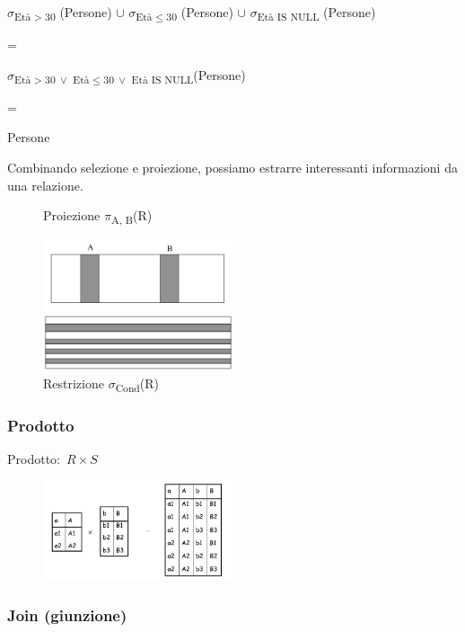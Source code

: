 \begin{center}
	$\sigma$\textsubscript{Età$>30$} (Persone) $\cup$ $\sigma$\textsubscript{Età$\leq 30$} (Persone) $\cup$ $\sigma$\textsubscript{Età IS NULL} (Persone)

	=

	$\sigma$\textsubscript{Età$>30\ \lor$ Età$\leq30\ \lor$ Età IS NULL}(Persone)

	=

	Persone
\end{center}
Combinando selezione e proiezione, possiamo estrarre interessanti informazioni da una relazione.

\begin{figure}[H]
	\centering
	\caption*{Proiezione $\pi$\textsubscript{A, B}(R)}
	\includegraphics[width=0.5\textwidth]{immagini/AR_proiezione.jpg}
	\caption*{Restrizione $\sigma$\textsubscript{Cond}(R)}
	\includegraphics[width=0.5\textwidth]{immagini/AR_selezione.jpg}
\end{figure}

\subsubsection{Prodotto}

Prodotto:\ $R \times S$
\begin{figure}[H]
	\centering
	\includegraphics[width=0.5\textwidth]{immagini/AR_prodotto.jpg}
\end{figure}

\subsubsection{Join (giunzione)}

